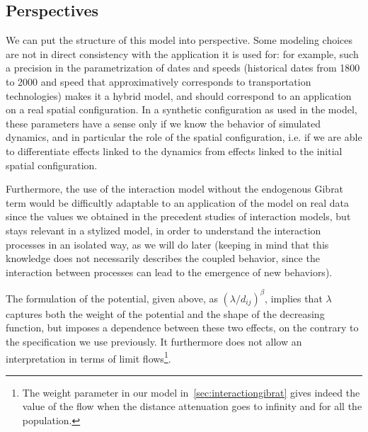


\subsection{Perspectives}

We can put the structure of this model into perspective. Some modeling choices are not in direct consistency with the application it is used for: for example, such a precision in the parametrization of dates and speeds (historical dates from 1800 to 2000 and speed that approximatively corresponds to transportation technologies) makes it a hybrid model, and should correspond to an application on a real spatial configuration. In a synthetic configuration as used in the model, these parameters have a sense only if we know the behavior of simulated dynamics, and in particular the role of the spatial configuration, i.e. if we are able to differentiate effects linked to the dynamics from effects linked to the initial spatial configuration.


Furthermore, the use of the interaction model without the endogenous Gibrat term would be difficultly adaptable to an application of the model on real data since the values we obtained in the precedent studies of interaction models, but stays relevant in a stylized model, in order to understand the interaction processes in an isolated way, as we will do later (keeping in mind that this knowledge does not necessarily describes the coupled behavior, since the interaction between processes can lead to the emergence of new behaviors).

The formulation of the potential, given above, as $(\lambda / d_{ij})^\beta$, implies that $\lambda$ captures both the weight of the potential and the shape of the decreasing function, but imposes a dependence between these two effects, on the contrary to the specification we use previously. It furthermore does not allow an interpretation in terms of limit flows\footnote{The weight parameter in our model in~\ref{sec:interactiongibrat} gives indeed the value of the flow when the distance attenuation goes to infinity and for all the population.}.

